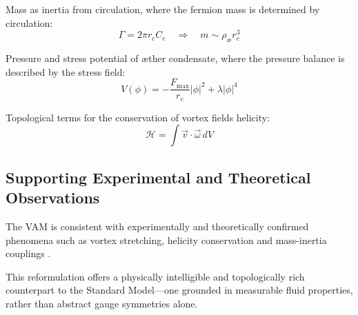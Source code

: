 Mass as inertia from circulation, where the fermion mass is determined by circulation:
\[
    \Gamma = 2\pi r_c C_e \quad\Rightarrow\quad m \sim \rho_\text{\ae} r_c^3
\]

Pressure and stress potential of æther condensate, where the pressure balance is described by the stress field:
\[
    V(\phi) = -\frac{F_\text{max}}{r_c}|\phi|^2 + \lambda|\phi|^4
\]

Topological terms for the conservation of vortex fields helicity:
\[
    \mathcal{H} = \int \vec{v}\cdot\vec{\omega}\, dV
\]

\subsection*{Supporting Experimental and Theoretical Observations}
The VAM is consistent with experimentally and theoretically confirmed phenomena such as vortex stretching, helicity conservation and mass-inertia couplings \cite{batchelor1953,vinen2002,bewley2008,moffatt1969,kleckner2013,scheeler2014,bartlett1986}.

This reformulation offers a physically intelligible and topologically rich counterpart to the Standard Model—one grounded in measurable fluid properties, rather than abstract gauge symmetries alone.
